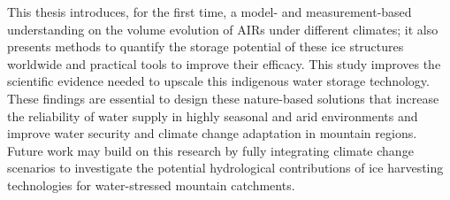 This thesis introduces, for the first time, a model- and measurement-based understanding on the volume evolution of
\ac{AIRs} under different climates; it also presents methods to quantify the storage potential of these ice structures
worldwide and practical tools to improve their efficacy. This study improves the scientific evidence needed to
upscale this indigenous water storage technology. These findings are essential to design these nature-based
solutions that increase the reliability of water supply in highly seasonal and arid environments and improve
water security and climate change adaptation in mountain regions. Future work may build on this research by
fully integrating climate change scenarios to investigate the potential hydrological contributions of ice
harvesting technologies for water-stressed mountain catchments.
